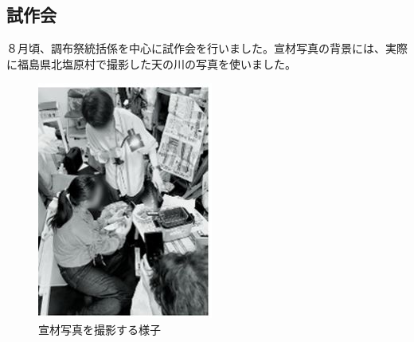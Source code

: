 \documentclass[../super_nova_20yy]{subfiles}
\begin{document}
\subsection{試作会}
８月頃、調布祭統括係を中心に試作会を行いました。宣材写真の背景には、実際に福島県北塩原村で撮影した天の川の写真を使いました。
\begin{figure}[H]
  \centering
  \begin{minipage}[t]{0.4\columnwidth}
    \centering
    \includegraphics[width=\columnwidth]{画像2.jpg}
    \caption{宣材写真を撮影する様子}
    \label{fig:2}
  \end{minipage}
  \begin{minipage}[t]{0.4\columnwidth}
    \centering

\end{minipage}
\end{figure}
\end{document}
